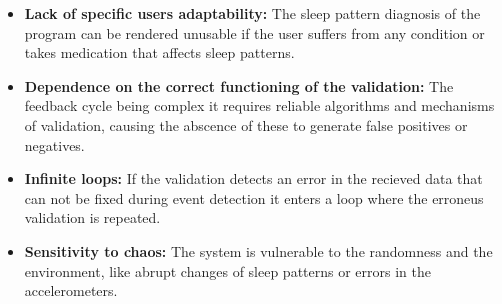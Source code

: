 \documentclass[conference]{IEEEtran}
\begin{document}
\begin{itemize}
    \item \textbf{Lack of specific users adaptability:} The sleep pattern diagnosis of the program can be rendered unusable if the user suffers from any condition or takes medication that affects sleep patterns.
    \item \textbf{Dependence on the correct functioning of the validation:} The feedback cycle being complex it requires reliable algorithms and mechanisms of validation, causing the abscence of these to generate false positives or negatives.  
    \item \textbf{Infinite loops:} If the validation detects an error in the recieved data that can not be fixed during event detection it enters a loop where the erroneus validation is repeated.
    \item \textbf{Sensitivity to chaos:} The system is vulnerable to the randomness and the environment, like abrupt changes of sleep patterns or errors in the accelerometers. 
\end{itemize}
\end{document}
